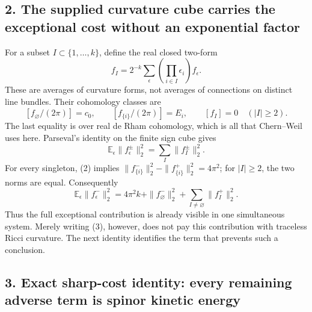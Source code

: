 \documentclass[
]{article}
\begin{document}
\hypertarget{the-supplied-curvature-cube-carries-the-exceptional-cost-without-an-exponential-factor}{%
\subsection{2. The supplied curvature cube carries the exceptional cost
without an exponential
factor}\label{the-supplied-curvature-cube-carries-the-exceptional-cost-without-an-exponential-factor}}

For a subset \(I\subset\{1,\ldots,k\}\), define the real closed two-form
\[
f_I=2^{-k}\sum_\epsilon\left(\prod_{i\in I}\epsilon_i\right)f_\epsilon.
\] These are averages of curvature forms, not averages of connections on
distinct line bundles. Their cohomology classes are \[
[f_\varnothing/(2\pi)]=c_0,\qquad
[f_{\{i\}}/(2\pi)]=E_i,\qquad
[f_I]=0\quad(|I|\ge2).
\tag{2}
\] The last equality is over real de Rham cohomology, which is all that
Chern--Weil uses here. Parseval's identity on the finite sign cube gives
\[
\mathbb E_\epsilon\|f_\epsilon^\pm\|_2^2
=\sum_I\|f_I^\pm\|_2^2.
\] For every singleton, (2) implies
\(\|f_{\{i\}}^-\|_2^2-\|f_{\{i\}}^+\|_2^2=4\pi^2\); for \(|I|\ge2\), the
two norms are equal. Consequently \[
\boxed{
\mathbb E_\epsilon\|f_\epsilon^-\|_2^2
=4\pi^2k+\|f_\varnothing^-\|_2^2
 +\sum_{I\ne\varnothing}\|f_I^+\|_2^2.}
\tag{3}
\] Thus the full exceptional contribution is already visible in one
simultaneous system. Merely writing (3), however, does not pay this
contribution with traceless Ricci curvature. The next identity
identifies the term that prevents such a conclusion.

\hypertarget{exact-sharp-cost-identity-every-remaining-adverse-term-is-spinor-kinetic-energy}{%
\subsection{3. Exact sharp-cost identity: every remaining adverse term
is spinor kinetic
energy}\label{exact-sharp-cost-identity-every-remaining-adverse-term-is-spinor-kinetic-energy}}
\end{document}
